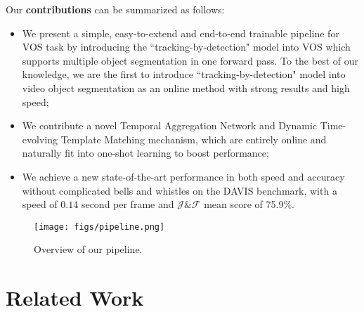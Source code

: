 \documentclass[10pt,twocolumn,letterpaper]{article}
\begin{document}
Our \textbf{contributions} can be summarized as follows:
\vspace{-3pt}
\begin{itemize}
   \item We present a simple, easy-to-extend and end-to-end trainable pipeline for VOS task by introducing the ``tracking-by-detection" model into VOS which supports multiple object segmentation in one forward pass. To the best of our knowledge, we are the first to introduce ``tracking-by-detection" model into video object segmentation as an online method with strong results and high speed;
\vspace{-3pt}
   \item We contribute a novel Temporal Aggregation Network and Dynamic Time-evolving Template Matching mechanism, which are entirely online and naturally fit into one-shot learning to boost performance;
\vspace{-3pt}
   \item We achieve a new state-of-the-art performance in both speed and accuracy without complicated bells and whistles on the DAVIS benchmark, with a speed of $0.14$ second per frame and $\mathcal{J} \& \mathcal{F}$ mean score of 75.9\%.
\end{itemize}

\begin{figure*}
\begin{center}
   \texttt{[image: figs/pipeline.png]}
\end{center}
\vspace{-0.2in}
   \caption{Overview of our pipeline.}
\label{fig:pipeline}
\vspace{-0.2in}
\end{figure*}

\section{Related Work}
\end{document}
